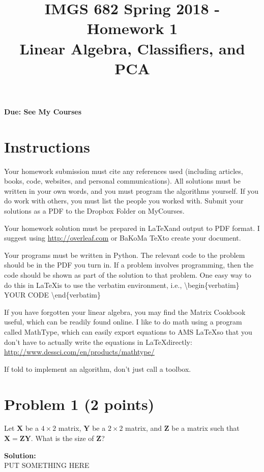 \documentclass[11pt, oneside]{article}   	%
\title{IMGS 682 Spring 2018 - Homework 1\\Linear Algebra, Classifiers, and PCA}
\date{}
\begin{document}
\maketitle

\textbf{Due: See My Courses}

\section*{Instructions}

Your homework submission must cite any references used (including articles, books, code, websites, and personal communications). All solutions must be written in your own words, and you must program the algorithms yourself. If you do work with others, you must list the people you worked with. Submit your solutions as a PDF to the Dropbox Folder on MyCourses.

Your homework solution must be prepared in \LaTeX and output to PDF format. I suggest using \url{http://overleaf.com} or BaKoMa \TeX  to create your document.

Your programs must be written in Python. The relevant code to the problem should be in the PDF you turn in. If a problem involves programming, then the code should be shown as part of the solution to that problem. One easy way to do this in \LaTeX is to use the verbatim environment, i.e., \textbackslash begin\{verbatim\} YOUR CODE \textbackslash end\{verbatim\}

If you have forgotten your linear algebra, you may find the Matrix Cookbook useful, which can be readily found online. I like to do math using a program called MathType, which can easily export equations to AMS \LaTeX so that you don't have to actually write the equations in \LaTeX directly: \url{http://www.dessci.com/en/products/mathtype/}

If told to implement an algorithm, don't just call a toolbox.

\clearpage

\section*{Problem 1 (2 points)}

Let ${\mathbf{X}}$ be a $4 \times 2$ matrix,   ${\mathbf{Y}}$ be a $2 \times 2$ matrix, and  ${\mathbf{Z}}$ be a matrix such that 
${\mathbf{X}}={\mathbf{Z}}{\mathbf{Y}}$. What is the size of ${\mathbf{Z}}$?

\textbf{Solution:}\\
PUT SOMETHING HERE 
\end{document}

